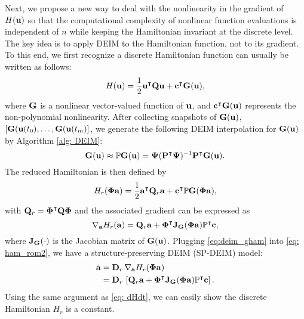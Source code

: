 \documentclass[11pt]{article}
\newcommand{\bP}{{\bf P}}
\newcommand{\bJ}{{\bf J}}
\begin{document}
Next, we propose a new way to deal with the nonlinearity in the gradient of $H({\bf u})$ so that  
the computational complexity of nonlinear function evaluations is independent of $n$ while keeping the Hamiltonian invariant at the discrete level. 
The key idea is to apply DEIM to the Hamiltonian function, not to its gradient. 
To this end, we first recognize a discrete Hamiltonian function can usually be written as follows:  
$$
H({\bf u}) = \frac{1}{2} {\bf u}^\intercal {\bf Q} {\bf u} + {\bf c}^\intercal {\bf G} ({\bf u}), 
$$
where ${\bf G}$ is a nonlinear vector-valued function of ${\bf u}$, and ${\bf c}^\intercal {\bf G} ({\bf u})$ represents the non-polynomial nonlinearity. 
After collecting snapshots of ${\bf G}({\bf u})$, $[{\bf G}({\bf u}(t_0), \ldots, {\bf G}({\bf u}(t_m)]$, we generate the following DEIM interpolation for ${\bf G}({\bf u})$ by Algorithm \ref{alg: DEIM}:
\begin{equation*}
\bG(\bu) \approx \mathbb{P} \bG(\bu) = {\bPsi}(\bP^\intercal {\bPsi})^{-1} \bP^\intercal \bG(\bu).
\label{eq:deim_g}
\end{equation*}
The reduced Hamiltonian is then defined by  
\begin{equation}
H_r(\boldsymbol{\Phi}{\bf a}) = \frac{1}{2} {\bf a}^\intercal {\bf Q}_r {\bf a} + {\bf c}^\intercal \mathbb{P} {\bf G} (\boldsymbol{\Phi} {\bf a}), 
\label{eq:deim_ham}
\end{equation}
with ${\bf Q}_r = \boldsymbol{\Phi}^\intercal {\bf Q} \boldsymbol{\Phi}$ and the associated gradient can be expressed as 
\begin{equation}
\nabla_{\ba}H_r(\ba) = \bQ_r \ba + \bPhi^\intercal \bJ_{\bG} (\bPhi \ba) \mathbb{P}^\intercal \bc, 
\label{eq:deim_gham}
\end{equation}
where $\bJ_{\bG}(\cdot)$ is the Jacobian matrix of ${\bf G}({\bf u})$. 
Plugging \eqref{eq:deim_gham} into \eqref{eq: ham_rom2}, we have a structure-preserving DEIM (SP-DEIM) model: 
\begin{equation}
\begin{aligned}
\dot{{\ba}} &= \bD_r\, \nabla_{\ba} H_r(\bPhi {\ba}) \\
			&= \bD_r\, \left[\bQ_r \ba + \bPhi^\intercal \bJ_{\bG} (\bPhi \ba) \mathbb{P}^\intercal \bc\right]. 
\label{eq: ham_rom3}
\end{aligned}
\end{equation}
Using the same argument as \eqref{eq: dHdt}, we can easily show the discrete Hamiltonian $H_r$ is a constant. 
\end{document}
